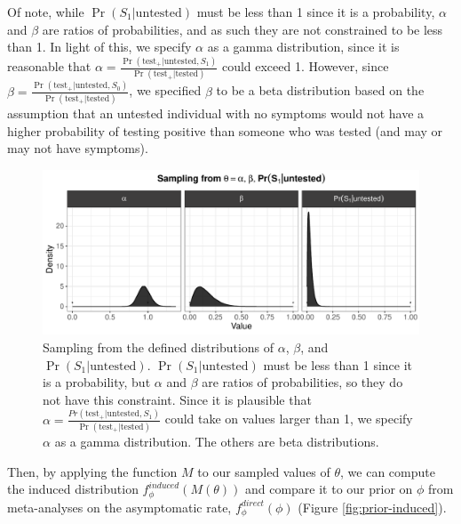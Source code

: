 \documentclass[12pt,twoside]{smiththesis}
\begin{document}
Of note, while \(\Pr(S_1|\text{untested})\) must be less than 1 since it is a probability, \(\alpha\) and \(\beta\) are ratios of probabilities, and as such they are not constrained to be less than 1. In light of this, we specify \(\alpha\) as a gamma distribution, since it is reasonable that
\(\alpha = \frac{\Pr(\text{test}_+|\text{untested}, S_1)}{\Pr(\text{test}_+|\text{tested})}\) could exceed 1. However, since \(\beta =\frac{\Pr(\text{test}_+|\text{untested}, S_0)}{\Pr(\text{test}_+|\text{tested})}\), we specified \(\beta\) to be a beta distribution based on the assumption that an untested individual with no symptoms would not have a higher probability of testing positive than someone who was tested (and may or may not have symptoms).
\begin{figure}

{\centering \includegraphics[width=1\linewidth]{figure/theta-samp-chap2} 

}

\caption{\label{fig:theta}Sampling from the defined distributions of $\alpha$, $\beta$, and $\Pr(S_1|\text{untested})$. $\Pr(S_1|\text{untested})$ must be less than 1 since it is a probability, but $\alpha$ and $\beta$ are ratios of probabilities, so they do not have this constraint. Since it is plausible that $\alpha = \frac{Pr(\text{test}_+|\text{untested}, S_1)}{\Pr(\text{test}_+|\text{tested})}$ could take on values larger than 1, we specify $\alpha$ as a gamma distribution. The others are beta distributions.}\label{fig:create-theta}
\end{figure}
Then, by applying the function \(M\) to our sampled values of \(\theta\), we can compute the induced distribution \(f_\phi^{induced}(M(\theta))\) and compare it to our prior on \(\phi\) from meta-analyses on the asymptomatic rate, \(f_\phi^{direct}(\phi)\) (Figure \ref{fig:prior-induced}).
\end{document}
